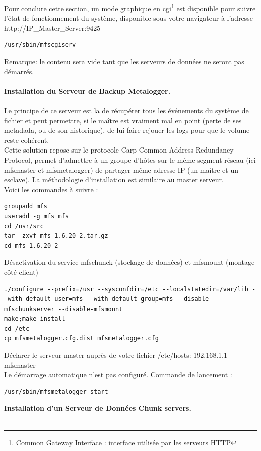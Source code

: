 \documentclass[12pt]{report}
\begin{document}
Pour conclure cette section, un mode graphique en cgi\footnote{Common Gateway Interface : interface utilisée par les serveurs HTTP} est disponible pour suivre l'état de fonctionnement du système, disponible sous votre navigateur à l'adresse http://IP\_Master\_Server:9425
  \begin{lstlisting}
/usr/sbin/mfscgiserv
	  \end{lstlisting}
Remarque: le contenu sera vide tant que les serveurs de données ne seront pas démarrés.\\\\
\newpage
\textbf{Installation du Serveur de Backup Metalogger.}\\\\
Le principe de ce serveur est la de récupérer tous les événements du système de fichier et peut permettre, si le maître est vraiment mal en point (perte de ses metadada, ou de son historique), de lui faire rejouer les logs pour que le volume reste cohérent.\\
Cette solution repose sur le protocole Carp \og Common Address Redundancy Protocol\fg, permet d'admettre à un groupe d'hôtes sur le même segment réseau (ici mfsmaster et mfsmetalogger) de partager même adresse IP (un maître et un esclave). 
La méthodologie d'installation est similaire au master serveur.\\
Voici les commandes à suivre :\\
  \begin{lstlisting}
groupadd mfs
useradd -g mfs mfs
cd /usr/src
tar -zxvf mfs-1.6.20-2.tar.gz
cd mfs-1.6.20-2
	  \end{lstlisting}
Désactivation du service mfschunck (stockage de données) et mfsmount (montage côté client)
  \begin{lstlisting}
./configure --prefix=/usr --sysconfdir=/etc --localstatedir=/var/lib --with-default-user=mfs --with-default-group=mfs --disable-mfschunkserver --disable-mfsmount
make;make install
cd /etc
cp mfsmetalogger.cfg.dist mfsmetalogger.cfg
	  \end{lstlisting}
Déclarer le serveur master auprès de votre fichier /etc/hosts: 192.168.1.1  mfsmaster\\
Le démarrage automatique n'est pas configuré. Commande de lancement :
  \begin{lstlisting}
/usr/sbin/mfsmetalogger start
	  \end{lstlisting}
\textbf{Installation d'un Serveur de Données Chunk servers.}\\\\
\end{document}
